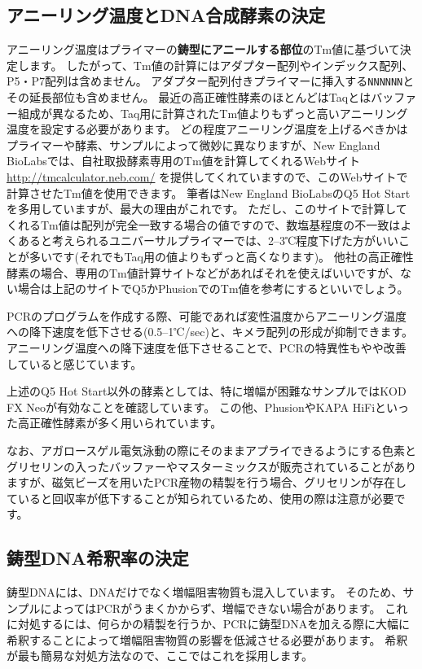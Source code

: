 \documentclass[titlepage,10pt,a4paper]{jsbook}
\begin{document}
\subsection{アニーリング温度とDNA合成酵素の決定}

アニーリング温度はプライマーの\textbf{鋳型にアニールする部位}のTm値に基づいて決定します。
したがって、Tm値の計算にはアダプター配列やインデックス配列、P5・P7配列は含めません。
アダプター配列付きプライマーに挿入する\texttt{NNNNNN}とその延長部位も含めません。
最近の高正確性酵素のほとんどはTaqとはバッファー組成が異なるため、Taq用に計算されたTm値よりもずっと高いアニーリング温度を設定する必要があります。
どの程度アニーリング温度を上げるべきかはプライマーや酵素、サンプルによって微妙に異なりますが、New England BioLabsでは、自社取扱酵素専用のTm値を計算してくれるWebサイト \url{http://tmcalculator.neb.com/} を提供してくれていますので、このWebサイトで計算させたTm値を使用できます。
筆者はNew England BioLabsのQ5 Hot Startを多用していますが、最大の理由がこれです。
ただし、このサイトで計算してくれるTm値は配列が完全一致する場合の値ですので、数塩基程度の不一致はよくあると考えられるユニバーサルプライマーでは、2--3℃程度下げた方がいいことが多いです(それでもTaq用の値よりもずっと高くなります)。
他社の高正確性酵素の場合、専用のTm値計算サイトなどがあればそれを使えばいいですが、ない場合は上記のサイトでQ5かPhusionでのTm値を参考にするといいでしょう。

PCRのプログラムを作成する際、可能であれば変性温度からアニーリング温度への降下速度を低下させる(0.5--1℃/sec)と、キメラ配列の形成が抑制できます\citep{Stevens2013}。
アニーリング温度への降下速度を低下させることで、PCRの特異性もやや改善していると感じています。

上述のQ5 Hot Start以外の酵素としては、特に増幅が困難なサンプルではKOD FX Neoが有効なことを確認しています。
この他、PhusionやKAPA HiFiといった高正確性酵素が多く用いられています。

なお、アガロースゲル電気泳動の際にそのままアプライできるようにする色素とグリセリンの入ったバッファーやマスターミックスが販売されていることがありますが、磁気ビーズを用いたPCR産物の精製を行う場合、グリセリンが存在していると回収率が低下することが知られているため、使用の際は注意が必要です。

\subsection{鋳型DNA希釈率の決定}

鋳型DNAには、DNAだけでなく増幅阻害物質も混入しています。
そのため、サンプルによってはPCRがうまくかからず、増幅できない場合があります。
これに対処するには、何らかの精製を行うか、PCRに鋳型DNAを加える際に大幅に希釈することによって増幅阻害物質の影響を低減させる必要があります。
希釈が最も簡易な対処方法なので、ここではこれを採用します。
\end{document}
